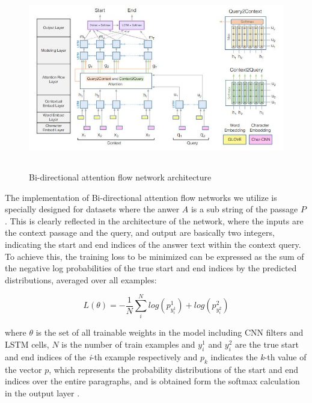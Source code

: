 \documentclass[11pt,a4paper]{article}
\begin{document}
\begin{figure}
  \includegraphics[width=\textwidth,height=8cm]{bidaf_architecture.JPG}
  \caption{Bi-directional attention flow network architecture}
\end{figure}


The implementation of Bi-directional attention flow networks we utilize  \cite{bidaf:2017} is specially designed for datasets where the anwer $A$ is a sub string of the passage $P$. This is clearly reflected in the architecture of the network, where the inputs are the context passage and the query, and output are basically two integers, indicating the start and end indices of the answer text within the context query. To achieve this, the training loss to be minimized can be expressed as the sum of the negative log probabilities of the true start and end indices by the predicted distributions, averaged over all examples:

$$
L(\theta)  = - \frac{1}{N} \sum^N_i log(p^1_{y^1_i}) + log(p^2_{y^2_i})
$$

where $\theta$ is the set of all trainable weights in the model including CNN filters and LSTM cells, $N$ is the number of train examples and $y^1_i$ and $y^2_i$ are the true start and end indices of the \textit{i}-th example respectively and $p_k$ indicates the \textit{k}-th value of the vector $p$, which represents the probability distributions of the start and end indices over the entire paragraphs, and is obtained form the softmax calculation in the output layer \cite{bidaf:2017}.

%
\end{document}
